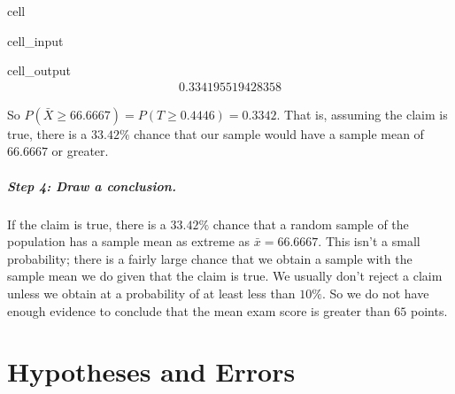 \documentclass[letterpaper,10pt,english]{jupyterBook}
\begin{document}
\begin{sphinxuseclass}{cell}\begin{sphinxVerbatimInput}

\begin{sphinxuseclass}{cell_input}
\begin{sphinxVerbatim}[commandchars=\\\{\}]
\end{sphinxVerbatim}

\end{sphinxuseclass}\end{sphinxVerbatimInput}
\begin{sphinxVerbatimOutput}

\begin{sphinxuseclass}{cell_output}\begin{equation*}
\begin{split}0.334195519428358\end{split}
\end{equation*}
\end{sphinxuseclass}\end{sphinxVerbatimOutput}

\end{sphinxuseclass}
\sphinxAtStartPar
So \(P(\bar{X} \geq 66.6667) = P(T \geq 0.4446) = 0.3342\). That is, assuming the claim is true, there is a \(33.42\%\) chance that our sample would have a sample mean of \(66.6667\) or greater.


\subparagraph{Step 4: Draw a conclusion.}
\label{\detokenize{Ch6 An Introduction to Hypothesis Testing/6.1 An Introduction to Hypothesis Testing:id10}}
\sphinxAtStartPar
If the claim is true, there is a \(33.42\%\) chance that a random sample of the population has a sample mean as extreme as \(\bar{x} = 66.6667\). This isn’t a small probability; there is a fairly large chance that we obtain a sample with the sample mean we do given that the claim is true. We usually don’t reject a claim unless we obtain at a probability of at least less than \(10\%\). So we do not have enough evidence to conclude that the mean exam score is greater than \(65\) points.

\sphinxstepscope


\section{Hypotheses and Errors}
\label{\detokenize{Ch6 An Introduction to Hypothesis Testing/6.2 Hypotheses and Errors:hypotheses-and-errors}}\label{\detokenize{Ch6 An Introduction to Hypothesis Testing/6.2 Hypotheses and Errors::doc}}
\end{document}

